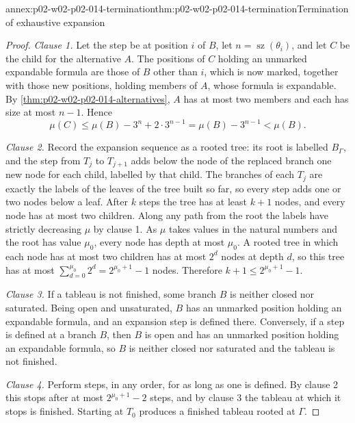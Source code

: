 \begin{annexitem}{annex:p02-w02-p02-014-termination}{thm:p02-w02-p02-014-termination}{Termination of exhaustive expansion}
\begin{proof}
\emph{Clause 1.}  Let the step be at position \(i\) of \(B\), let
\(n=\operatorname{sz}(\theta_i)\), and let \(C\) be the child for the
alternative \(A\).  The positions of \(C\) holding an unmarked expandable
formula are those of \(B\) other than \(i\), which is now marked, together
with those new positions, holding members of \(A\), whose formula is
expandable.  By \cref{thm:p02-w02-p02-014-alternatives}, \(A\) has at most
two members and each has size at most \(n-1\).  Hence
\[
  \mu(C)\leq\mu(B)-3^{n}+2\cdot3^{n-1}=\mu(B)-3^{n-1}<\mu(B).
\]

\emph{Clause 2.}  Record the expansion sequence as a rooted tree: its root
is labelled \(B_\Gamma\), and the step from \(T_j\) to \(T_{j+1}\) adds below
the node of the replaced branch one new node for each child, labelled by that
child.  The branches of each \(T_j\) are exactly the labels of the leaves of
the tree built so far, so every step adds one or two nodes below a leaf.
After \(k\) steps the tree has at least \(k+1\) nodes, and every node has at
most two children.  Along any path from the root the labels have strictly
decreasing \(\mu\) by clause 1.  As \(\mu\) takes values in the natural
numbers and the root has value \(\mu_0\), every node has depth at most
\(\mu_0\).  A rooted tree in which each node has at most two children has at
most \(2^{d}\) nodes at depth \(d\), so this tree has at most
\(\sum_{d=0}^{\mu_0}2^{d}=2^{\mu_0+1}-1\) nodes.  Therefore
\(k+1\leq2^{\mu_0+1}-1\).

\emph{Clause 3.}  If a tableau is not finished, some branch \(B\) is neither
closed nor saturated.  Being open and unsaturated, \(B\) has an unmarked
position holding an expandable formula, and an expansion step is defined
there.  Conversely, if a step is defined at a branch \(B\), then \(B\) is
open and has an unmarked position holding an expandable formula, so \(B\) is
neither closed nor saturated and the tableau is not finished.

\emph{Clause 4.}  Perform steps, in any order, for as long as one is defined.
By clause 2 this stops after at most \(2^{\mu_0+1}-2\) steps, and by clause 3
the tableau at which it stops is finished.  Starting at \(T_0\) produces a
finished tableau rooted at \(\Gamma\).
\end{proof}
\end{annexitem}


